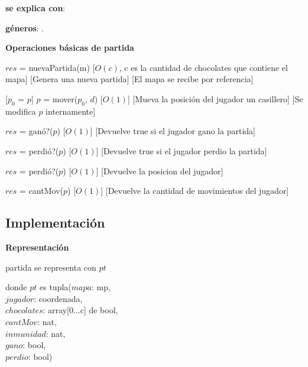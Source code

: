 \documentclass[10pt, a4paper]{article}
\begin{document}
    \begin{Interfaz}

        \textbf{se explica con}: 

        \textbf{géneros}: .

        \textbf{Operaciones básicas de partida}

            {$res$ = nuevaPartida(m)}%
            [$O(c)$, c es la cantidad de chocolates que contiene el mapa]
            [Genera una nueva partida]
            [El mapa se recibe por referencia]

            [$p_0$ = $p$]
            {$p$ = mover($p_0$, $d$)}%
            [$O(1)$]
            [Mueva la posición del jugador un casillero]
            [Se modifica $p$ internamente]

            {$res$ = ganó?($p$)}%
            [$O(1)$]
            [Devuelve true si el jugador gano la partida]

            {$res$ = perdió?($p$)}%
            [$O(1)$]
            [Devuelve true si el jugador perdio la partida]

            {$res$ = perdió?($p$)}%
            [$O(1)$]
            [Devuelve la posicion del jugador]

            {$res$ = cantMov($p$)}%
            [$O(1)$]
            [Devuelve la cantidad de movimientos del jugador]

    \end{Interfaz}

    \newpage

    \subsection*{Implementación}

    \textbf{Representación}

    partida se representa con $pt$

    donde $pt$ es tupla($mapa$: mp, \\
        \text{}\qquad\quad$jugador$: coordenada, \\
        \text{}\qquad\quad$chocolates$: array[0...c] de bool, \\
        \text{}\qquad\quad$cantMov$: nat, \\
        \text{}\qquad\quad$inmunidad$: nat, \\
        \text{}\qquad\quad$gano$: bool, \\
        \text{}\qquad\quad$perdio$: bool)
\end{document}
